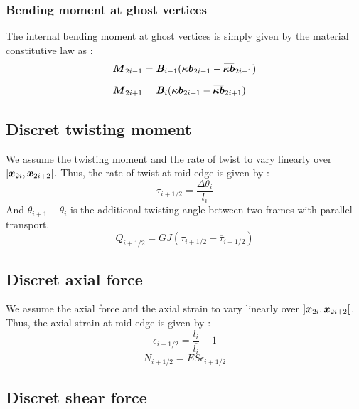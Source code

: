 \subsubsection{Bending moment at ghost vertices}

The internal bending moment at ghost vertices is simply given by the material constitutive law as :
\begin{subequations}
	\begin{align}
		\vect{M}_{2i-1} &=  \mat{B}_{i-1}(\vect{\kappa b}_{2i-1} - \overbar{\vect{\kappa b}}_{2i-1})
		\\[0.5em]
		\vect{M}_{2i+1} &=  \mat{B}_{i}(\vect{\kappa b}_{2i+1} - \overbar{\vect{\kappa b}}_{2i+1})
	\end{align}
\end{subequations}

\subsection{Discret twisting moment}

We assume the twisting moment and the rate of twist to vary linearly over $]\boldsymbol{x}_{2i},  \boldsymbol{x}_{2i+2}[$.
Thus, the rate of twist at mid edge is given by :
\begin{equation}
	\tau_{i+1/2} = \frac{\Delta\theta_{i}}{l_i}
\end{equation}
And $\theta_{i+1} - \theta_{i}$ is the additional twisting angle between two frames with parallel transport.
\begin{equation}
	Q_{i+1/2} =  GJ(\tau_{i+1/2} - \overbar{\tau}_{i+1/2})
\end{equation}

\subsection{Discret axial force}

We assume the axial force and the axial strain to vary linearly over $]\boldsymbol{x}_{2i},  \boldsymbol{x}_{2i+2}[$.
Thus, the axial strain at mid edge is given by :
\begin{equation}
	\epsilon_{i+1/2} = \frac{l_{i}}{\overbar{l_i}} - 1
\end{equation}
\begin{equation}
	N_{i+1/2} =  ES\epsilon_{i+1/2}
\end{equation}

\subsection{Discret shear force}

